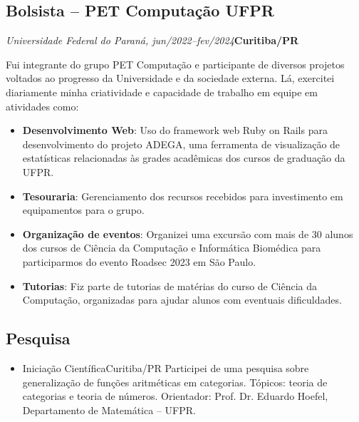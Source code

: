 \documentclass[a4paper, 12pt]{moderncv}
\begin{document}
\subsection{\small{Bolsista -- PET Computação UFPR}}
\textit{Universidade Federal do Paraná, jun/2022--fev/2024}\hspace{170pt}\textbf{Curitiba/PR}

\vspace{3pt}
Fui integrante do grupo PET Computação e participante de diversos projetos
voltados ao progresso da Universidade e da sociedade externa. Lá, exercitei
diariamente minha criatividade e capacidade de trabalho em equipe em
atividades como:
\vspace{4pt}
\begin{itemize}
    \item{\textbf{Desenvolvimento Web}: Uso do framework web Ruby on Rails para
          desenvolvimento do projeto ADEGA, uma ferramenta de visualização de
          estatísticas relacionadas às grades acadêmicas dos cursos de graduação da
          UFPR.}
    \item{\textbf{Tesouraria}: Gerenciamento dos recursos recebidos para investimento
          em equipamentos para o grupo.}
    \item{\textbf{Organização de eventos}: Organizei uma excursão com mais de
          30 alunos dos cursos de Ciência da Computação e Informática Biomédica
          para participarmos do evento Roadsec 2023 em São Paulo.}
    \item{\textbf{Tutorias}: Fiz parte de tutorias de matérias do curso de Ciência
          da Computação, organizadas para ajudar alunos com eventuais dificuldades.}
\end{itemize}

\vspace{4pt}
\subsection{\small{Pesquisa}}
\begin{itemize}
    \item{
        {Iniciação Científica}{Curitiba/PR}{}
        {Participei de uma pesquisa sobre generalização de funções aritméticas em
         categorias. Tópicos: teoria de categorias e teoria de números. Orientador:
         Prof. Dr. Eduardo Hoefel, Departamento de Matemática -- UFPR.}}
\end{itemize}
\end{document}

